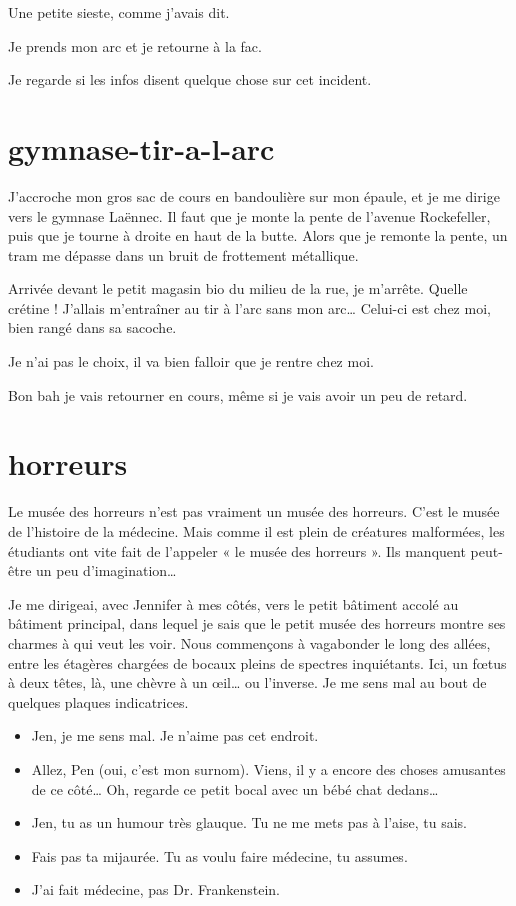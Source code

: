 \item Une petite sieste, comme j'avais dit. 
\item Je prends mon arc et je retourne à la fac. 
\item Je regarde si les infos disent quelque chose sur cet incident. 
\enw

\section{gymnase-tir-a-l-arc}

J'accroche mon gros sac de cours en bandoulière sur mon épaule, et je me dirige vers le gymnase Laënnec. Il faut que je monte la pente de l'avenue Rockefeller, puis que je tourne à droite en haut de la butte. Alors que je remonte la pente, un tram me dépasse dans un bruit de frottement métallique.

Arrivée devant le petit magasin bio du milieu de la rue, je m'arrête. Quelle crétine ! J'allais m'entraîner au tir à l'arc sans mon arc… Celui-ci est chez moi, bien rangé dans sa sacoche.

\item Je n'ai pas le choix, il va bien falloir que je rentre chez moi. 
\item Bon bah je vais retourner en cours, même si je vais avoir un peu de retard. 
\enw

\section{horreurs}

Le musée des horreurs n'est pas vraiment un musée des horreurs. C'est le musée de l'histoire de la médecine. Mais comme il est plein de créatures malformées, les étudiants ont vite fait de l'appeler « le musée des horreurs ». Ils manquent peut-être un peu d'imagination…

Je me dirigeai, avec Jennifer à mes côtés, vers le petit bâtiment accolé au bâtiment principal, dans lequel je sais que le petit musée des horreurs montre ses charmes à qui veut les voir. Nous commençons à vagabonder le long des allées, entre les étagères chargées de bocaux pleins de spectres inquiétants. Ici, un fœtus à deux têtes, là, une chèvre à un œil… ou l'inverse. Je me sens mal au bout de quelques plaques indicatrices.

\begin{itemize}
\item Jen, je me sens mal. Je n'aime pas cet endroit.
\item Allez, Pen (oui, c'est mon surnom). Viens, il y a encore des choses amusantes de ce côté… Oh, regarde ce petit bocal avec un bébé chat dedans…
\item Jen, tu as un humour très glauque. Tu ne me mets pas à l'aise, tu sais.
\item Fais pas ta mijaurée. Tu as voulu faire médecine, tu assumes.
\item J'ai fait médecine, pas Dr. Frankenstein.
\end{itemize}

